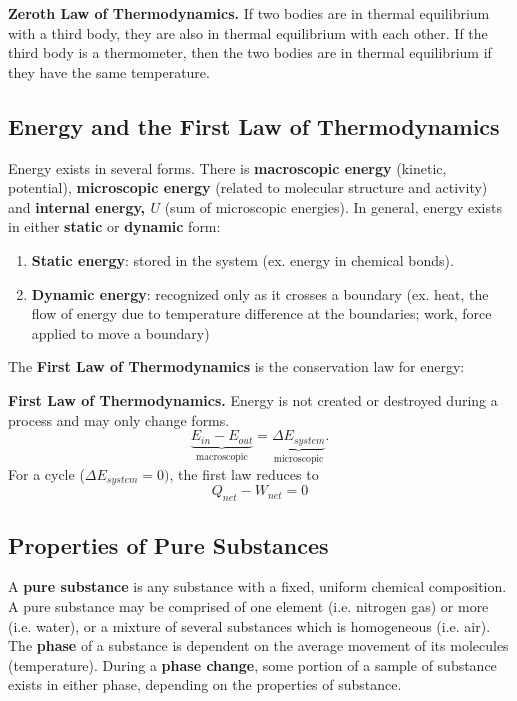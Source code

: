 \begin{shaded}
    \textbf{Zeroth Law of Thermodynamics.} If two bodies are in thermal equilibrium with a third body, they are also in thermal equilibrium with each other. If the third body is a thermometer, then the two bodies are in thermal equilibrium if they have the same temperature.
\end{shaded}

\subsection{Energy and the First Law of Thermodynamics}

Energy exists in several forms. There is \textbf{macroscopic energy} (kinetic, potential), \textbf{microscopic energy} (related to molecular structure and activity) and \textbf{internal energy, $U$} (sum of microscopic energies). In general, energy exists in either \textbf{static} or \textbf{dynamic} form:
\begin{enumerate}
    \item \textbf{Static energy}: stored in the system (ex. energy in chemical bonds).
    \item \textbf{Dynamic energy}: recognized only as it crosses a boundary (ex. heat, the flow of energy due to temperature difference at the boundaries; work, force applied to move a boundary)
\end{enumerate}

The \textbf{First Law of Thermodynamics} is the conservation law for energy:

\begin{shaded}
    \textbf{First Law of Thermodynamics.} Energy is not created or destroyed during a process and may only change forms. \[\underbrace{E_{in} - E_{out}}_{\text{macroscopic}} = \underbrace{\Delta E_{system}}_{\text{microscopic}}.\]
    For a cycle ($\Delta E_{system} = 0)$, the first law reduces to \[Q_{net}-W_{net} = 0\]
\end{shaded}

\subsection{Properties of Pure Substances}

A \textbf{pure substance} is any substance with a fixed, uniform chemical composition. A pure substance may be comprised of one element (i.e. nitrogen gas) or more (i.e. water), or a mixture of several substances which is homogeneous (i.e. air). The \textbf{phase} of a substance is dependent on the average movement of its molecules (temperature). During a \textbf{phase change}, some portion of a sample of substance exists in either phase, depending on the properties of substance. 

